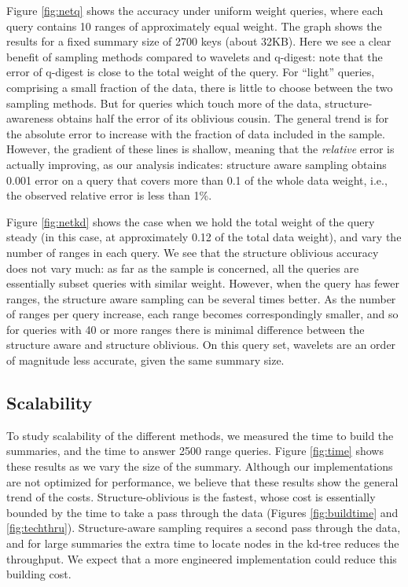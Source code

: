 \documentclass[11pt]{article}
\begin{document}
Figure \ref{fig:netq} shows the accuracy under uniform weight queries, 
where each query contains 10 ranges of approximately equal weight.  
The graph shows the results for a fixed summary size of 2700 keys 
(about 32KB).
Here we see a clear benefit of sampling methods compared to wavelets
and q-digest:  note that the error of q-digest is close to
the total weight of the query. 
For ``light'' queries, comprising a small fraction of the data, there
is little to choose between the two sampling methods.  
But for queries which touch more of the data, structure-awareness
obtains half the error of its oblivious cousin. 
The general trend is for the absolute error to increase with the
fraction of data included in the sample. 
However, 
the gradient of these lines is shallow, meaning that
 the {\em relative} error is actually improving, as our analysis indicates: 
 structure aware sampling obtains 0.001 error on a query that covers
more than 0.1 of the whole data weight, i.e., the observed
relative error is less than 1\%. 

Figure \ref{fig:netkd} shows the case when we hold the total weight of
the query steady (in this case, at approximately 0.12 of the total
data weight), and vary the number of ranges in each query. 
We see that the structure oblivious accuracy does not vary much: 
as far as the sample is concerned, all the queries are essentially
subset queries with similar weight. 
However, when the query has fewer ranges, the structure aware sampling can
be several times better. 
As the number of ranges per query increase, each range becomes
correspondingly smaller, and so for queries with 40 or more ranges
there is minimal difference between the structure aware and structure
oblivious. 
On this query set, wavelets are an order of magnitude less accurate,
given the same summary size. 

\subsection{Scalability}
To study scalability of the different methods, we measured the time to
build the summaries, and the time to answer 2500
range queries. 
Figure \ref{fig:time} shows these results as we
vary the size of the summary. 
Although our implementations are not
optimized for performance, we believe that these results show the general
trend of the costs. 
Structure-oblivious is the fastest, whose cost is essentially
bounded by the time to take a pass through the data
(Figures \ref{fig:buildtime} and \ref{fig:techthru}). 
Structure-aware sampling requires a second pass through the data, 
and for large summaries the 
extra time to locate nodes in the kd-tree reduces the throughput.  
We expect that a more engineered implementation could reduce this
building cost. 
\end{document}
